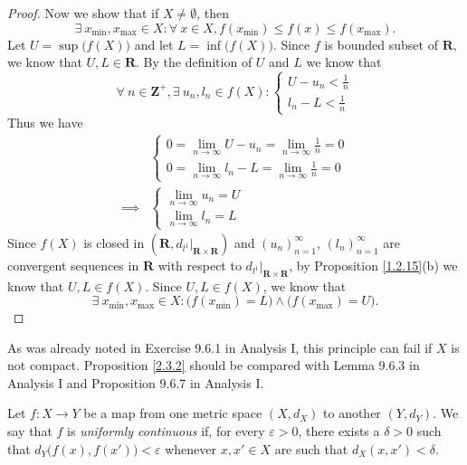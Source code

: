 \begin{proof}
    Now we show that if \(X \neq \emptyset\), then
    \[
        \exists\ x_{\min}, x_{\max} \in X : \forall\ x \in X, f(x_{\min}) \leq f(x) \leq f(x_{\max}).
    \]
    Let \(U = \sup\big(f(X)\big)\) and let \(L = \inf\big(f(X)\big)\).
    Since \(f\) is bounded subset of \(\mathbf{R}\), we know that \(U, L \in \mathbf{R}\).
    By the definition of \(U\) and \(L\) we know that
    \[
        \forall\ n \in \mathbf{Z}^+, \exists\ u_n, l_n \in f(X) : \begin{cases}
            U - u_n < \frac{1}{n} \\
            l_n - L < \frac{1}{n}
        \end{cases}
    \]
    Thus we have
    \begin{align*}
                 & \begin{cases}
            0 = \lim_{n \to \infty} U - u_n = \lim_{n \to \infty} \frac{1}{n} = 0 \\
            0 = \lim_{n \to \infty} l_n - L = \lim_{n \to \infty} \frac{1}{n} = 0
        \end{cases} \\
        \implies & \begin{cases}
            \lim_{n \to \infty} u_n = U \\
            \lim_{n \to \infty} l_n = L
        \end{cases}
    \end{align*}
    Since \(f(X)\) is closed in \((\mathbf{R}, d_{l^1}|_{\mathbf{R} \times \mathbf{R}})\) and \((u_n)_{n = 1}^\infty\), \((l_n)_{n = 1}^\infty\) are convergent sequences in \(\mathbf{R}\) with respect to \(d_{l^1}|_{\mathbf{R} \times \mathbf{R}}\), by Proposition \ref{1.2.15}(b) we know that \(U, L \in f(X)\).
    Since \(U, L \in f(X)\), we know that
    \[
        \exists\ x_{\min}, x_{\max} \in X : \big(f(x_{\min}) = L\big) \land \big(f(x_{\max}) = U\big).
    \]
\end{proof}

\begin{remark}\label{2.3.3}
    As was already noted in Exercise 9.6.1 in Analysis I, this principle can fail if \(X\) is not compact.
    Proposition \ref{2.3.2} should be compared with Lemma 9.6.3 in Analysis I and Proposition 9.6.7 in Analysis I.
\end{remark}

\begin{definition}\label{2.3.4}
    Let \(f : X \to Y\) be a map from one metric space \((X, d_X)\) to another \((Y, d_Y)\).
    We say that \(f\) is \emph{uniformly continuous} if, for every \(\varepsilon > 0\), there exists a \(\delta > 0\) such that \(d_Y\big(f(x), f(x')\big) < \varepsilon\) whenever \(x, x' \in X\) are such that \(d_X(x, x') < \delta\).
\end{definition}